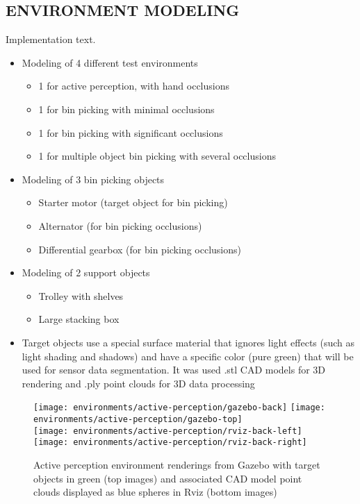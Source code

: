 \subsection{\uppercase{Environment modeling}}

Implementation text.

\begin{itemize}
	\item Modeling of 4 different test environments
	\begin{itemize}
		\item 1 for active perception, with hand occlusions
		\item 1 for bin picking with minimal occlusions
		\item 1 for bin picking with significant occlusions
		\item 1 for multiple object bin picking with several occlusions
	\end{itemize}
	\item Modeling of 3 bin picking objects
	\begin{itemize}
		\item Starter motor (target object for bin picking)
		\item Alternator (for bin picking occlusions)
		\item Differential gearbox (for bin picking occlusions)
	\end{itemize}
	\item Modeling of 2 support objects
	\begin{itemize}
		\item Trolley with shelves
		\item Large stacking box
	\end{itemize}
	\item Target objects use a special surface material that ignores light effects (such as light shading and shadows) and have a specific color (pure green) that will be used for sensor data segmentation. It was used .stl CAD models for 3D rendering and .ply point clouds for 3D data processing
\end{itemize}

\begin{figure}
	\centering
	\texttt{[image: environments/active-perception/gazebo-back]}
	\texttt{[image: environments/active-perception/gazebo-top]}\\
	\texttt{[image: environments/active-perception/rviz-back-left]}
	\texttt{[image: environments/active-perception/rviz-back-right]}
	\caption{Active perception environment renderings from Gazebo with target objects in green (top images) and associated CAD model point clouds displayed as blue spheres in Rviz (bottom images)}
\end{figure}

